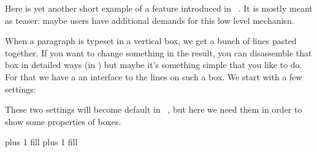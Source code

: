 %

\ifdefined{}     {}    \plusone \fi %
\ifdefined\normalizelinemode \normalizelinemode\plusone \fi %


\usemodule[scite]

\startbuffer[abstract]
    Here is yet another short example of a feature introduced in \CONTEXT\ \LMTX.
    It is mostly meant as teaser: maybe users have additional demands for this
    low level mechanisn.
\stopbuffer

\setuplayout
  [backspace=20mm,
   topspace=10mm]

\startdocument
  [title={Playing with boxes, a teaser},
   author={Hans Hagen},
   date=August 2020,
   number=1105 LMTX]

When a paragraph is typeset in a vertical box, we get a bunch of lines pasted
together. If you want to change something in the result, you can disassemble that
box in detailed ways (in \LUA) but maybe it's something simple that you like to
do. For that we have a an interface to the lines on such a box. We start with a
few settings:

\starttyping[option=TEX]
    \plusone
\normalizelinemode\plusone
\stoptyping

These two settings will become default in \CONTEXT\ \LMTX, but here we need them in
order to show some properties of boxes.

\startbuffer[sample]
 \bgroup
    \leftskip         10pt
    \rightskip        20pt
    \hangindent       40pt
    \parindent         5pt
    \parfillleftskip  80pt plus 1 fill
    \parfillrightskip 40pt plus 1 fill
    
\egroup
\stopbuffer

